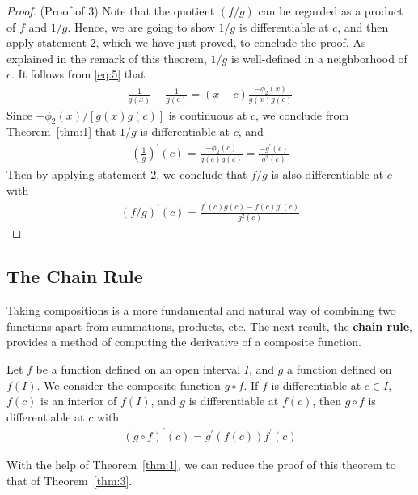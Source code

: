 \documentclass[thmcnt=section, 12pt]{my-elegantbook}
\begin{document}
\begin{proof}
    (Proof of 3) Note that the quotient $(f / g)$ can be regarded as a product of $f$ and $1 / g$. Hence, we are going to show $1/g$ is differentiable at $c$, and then apply statement 2, which we have just proved, to conclude the proof. As explained in the remark of this theorem, $1/g$ is well-defined in a neighborhood of $c$. It follows from \eqref{eq:5} that 
    \begin{align*}
        \frac{1}{g(x)} - \frac{1}{g(c)}
        = (x - c) \frac{-\phi_2(x)}{g(x)g(c)}
    \end{align*}
    Since $-\phi_2(x) / [g(x)g(c)]$ is continuous at $c$, we conclude from Theorem~\ref{thm:1} that $1/g$ is differentiable at $c$, and 
    \begin{align*}
        \left( \frac{1}{g} \right)^\prime (c)
        = \frac{-\phi_2(c)}{g(c)g(c)}
        = \frac{-g^\prime(c)}{g^2(c)}
    \end{align*}
    Then by applying statement 2, we conclude that $f / g$ is also differentiable at $c$ with 
    \begin{align*}
        (f / g)^\prime(c) = \frac{f^\prime(c) g(c) - f(c) g^\prime(c)}{ g^2(c) }
    \end{align*}
\end{proof}


\subsection{The Chain Rule}

Taking compositions is a more fundamental and natural way of combining two functions apart from summations, products, etc. The next result, the \textbf{chain rule}, provides a method of computing the derivative of a composite function.

\begin{theorem} \label{thm:4}
    Let $f$ be a function defined on an open interval $I$, and $g$ a function defined on $f(I)$. We consider the composite function $g \circ f$. If $f$ is differentiable at $c \in I$, $f(c)$ is an interior of $f(I)$, and $g$ is differentiable at $f(c)$, then $g \circ f$ is differentiable at $c$ with 
    \begin{align}
        (g \circ f)^\prime (c)
        = g^\prime(f(c)) f^\prime(c)
        \label{eq:9}
    \end{align}
\end{theorem}

With the help of Theorem~\ref{thm:1}, we can reduce the proof of this theorem to that of Theorem~\ref{thm:3}.
\end{document}
